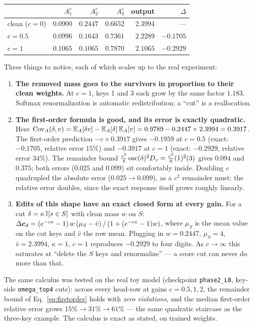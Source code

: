 \documentclass{article}
\begin{document}
\begin{center}
\begin{tabular}{lrrrrr}
\toprule
 & $A^c_1$ & $A^c_2$ & $A^c_3$ & output & $\Delta$ \\
\midrule
clean ($c=0$) & $0.0900$ & $0.2447$ & $0.6652$ & $2.3994$ & --- \\
$c = 0.5$ & $0.0996$ & $0.1643$ & $0.7361$ & $2.2289$ & $-0.1705$ \\
$c = 1$ & $0.1065$ & $0.1065$ & $0.7870$ & $2.1065$ & $-0.2929$ \\
\bottomrule
\end{tabular}
\end{center}

Three things to notice, each of which scales up to the real experiment:
\begin{enumerate}
    \item \textbf{The removed mass goes to the survivors in proportion to their clean weights.} At $c = 1$, keys 1 and 3 each grow by the same factor $1.183$. Softmax renormalization is automatic redistribution; a ``cut'' is a reallocation.
    \item \textbf{The first-order formula is good, and its error is exactly quadratic.} Here $\operatorname{Cov}_A(\delta, v) = \mathbb{E}_A[\delta v] - \mathbb{E}_A[\delta]\,\mathbb{E}_A[v] = 0.9789 - 0.2447 \times 2.3994 = 0.3917$. The first-order prediction $-c \times 0.3917$ gives $-0.1959$ at $c = 0.5$ (exact: $-0.1705$, relative error $15\%$) and $-0.3917$ at $c = 1$ (exact: $-0.2929$, relative error $34\%$). The remainder bound $\tfrac{c^2}{8}\operatorname{osc}(\delta)^2 D_v = \tfrac{c^2}{8}(1)^2(3)$ gives $0.094$ and $0.375$; both errors ($0.025$ and $0.099$) sit comfortably inside. Doubling $c$ quadrupled the absolute error ($0.025 \to 0.099$), as a $c^2$ remainder must; the relative error doubles, since the exact response itself grows roughly linearly.
    \item \textbf{Edits of this shape have an exact closed form at every gain.} For a cut $\delta = \kappa\,\mathbb{I}[s \in S]$ with clean mass $w$ on $S$: $\Delta\boldsymbol{c}_d = (e^{-c\kappa} - 1)\, w\, (\mu_S - \bar v)\, /\, (1 + (e^{-c\kappa} - 1) w)$, where $\mu_S$ is the mean value on the cut keys and $\bar v$ the row mean. Plugging in $w = 0.2447$, $\mu_S = 4$, $\bar v = 2.3994$, $\kappa = 1$, $c = 1$ reproduces $-0.2929$ to four digits. As $c \to \infty$ this saturates at ``delete the $S$ keys and renormalize'' --- a score cut can never do more than that.
\end{enumerate}

The same calculus was tested on the real toy model (checkpoint \texttt{phase2\_L0}, key-side \texttt{omega\_top4} cuts): across every head-row at gains $c = 0.5, 1, 2$, the remainder bound of Eq.~\eqref{eq:firstorder} holds with \emph{zero violations}, and the median first-order relative error grows $15\% \to 31\% \to 61\%$ --- the same quadratic staircase as the three-key example. The calculus is exact as stated, on trained weights.
\end{document}
